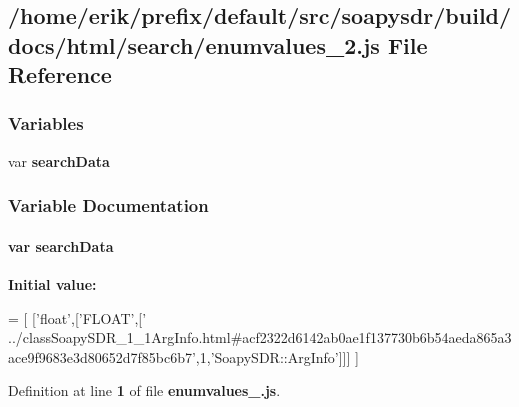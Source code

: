 \subsection{/home/erik/prefix/default/src/soapysdr/build/docs/html/search/enumvalues\+\_\+2.js File Reference}
\label{enumvalues__2_8js}
\subsubsection*{Variables}
\begin{DoxyCompactItemize}
\item 
var {\bf search\+Data}
\end{DoxyCompactItemize}


\subsubsection{Variable Documentation}
\paragraph[{search\+Data}]{\setlength{\rightskip}{0pt plus 5cm}var search\+Data}\label{enumvalues__2_8js_ad01a7523f103d6242ef9b0451861231e}
{\bfseries Initial value\+:}
\begin{DoxyCode}
=
[
  [\textcolor{stringliteral}{'float'},[\textcolor{stringliteral}{'FLOAT'},[\textcolor{stringliteral}{'
      ../classSoapySDR\_1\_1ArgInfo.html#acf2322d6142ab0ae1f137730b6b54aeda865a3ace9f9683e3d80652d7f85bc6b7'},1,\textcolor{stringliteral}{'SoapySDR::ArgInfo'}]]]
]
\end{DoxyCode}


Definition at line {\bf 1} of file {\bf enumvalues\+\_.\+js}.

